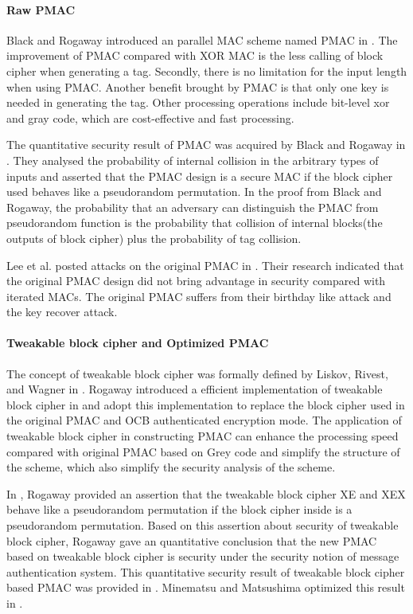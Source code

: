 \documentclass{article}
\begin{document}
\paragraph{Raw PMAC}
Black and Rogaway introduced an parallel MAC scheme named PMAC in \cite{pmac}. 
The improvement of PMAC compared with XOR MAC is the less calling of block cipher when generating a tag. Secondly, there is no limitation for the input length when using PMAC. 
Another benefit brought by PMAC is that only one key is needed in generating the tag. Other processing operations include bit-level xor and gray code, which are cost-effective and fast processing. 

The quantitative security result of PMAC was acquired by Black and Rogaway in \cite{pmac}. They analysed the probability of internal collision in the arbitrary types of inputs and asserted that the PMAC design is a secure MAC if the block cipher used behaves like a pseudorandom permutation. In the proof from Black and Rogaway, the probability that an adversary can distinguish the PMAC from pseudorandom function is the probability that collision of internal blocks(the outputs of block cipher) plus the probability of tag collision. 

Lee et al. posted attacks on the original PMAC in \cite{pmac_forgery}. Their research indicated that the original PMAC design did not bring advantage in security compared with iterated MACs. The original PMAC suffers from their birthday like attack and the key recover attack.
\paragraph{Tweakable block cipher and Optimized PMAC}
The concept of tweakable block cipher was formally defined by Liskov, Rivest, and Wagner in \cite{tweak}. Rogaway introduced a efficient implementation of tweakable block cipher in \cite{tweak_pmac}and adopt this implementation to replace the block cipher used in the original PMAC and OCB authenticated encryption mode.
The application of tweakable block cipher in constructing PMAC can enhance the processing speed compared with original PMAC based on Grey code and simplify the structure of the scheme, which also simplify the security analysis of the scheme. 

In \cite{tweak_pmac}, Rogaway provided an assertion that the tweakable block cipher XE and XEX behave like a pseudorandom permutation if the block cipher inside is a pseudorandom permutation. Based on this assertion about security of tweakable block cipher, Rogaway gave an quantitative conclusion that the new PMAC based on tweakable block cipher is security under the security notion of message authentication system. This quantitative security result of tweakable block cipher based PMAC was provided in \cite{tweak_pmac}.
Minematsu and Matsushima optimized this result in \cite{new}. 
\end{document}
